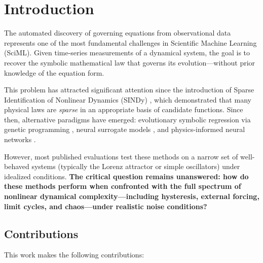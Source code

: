 \section{Introduction}
\label{sec:intro}

The automated discovery of governing equations from observational data represents one of the most fundamental challenges in Scientific Machine Learning (SciML). Given time-series measurements of a dynamical system, the goal is to recover the symbolic mathematical law that governs its evolution---without prior knowledge of the equation form.

This problem has attracted significant attention since the introduction of Sparse Identification of Nonlinear Dynamics (SINDy) \cite{brunton2016}, which demonstrated that many physical laws are \textit{sparse} in an appropriate basis of candidate functions. Since then, alternative paradigms have emerged: evolutionary symbolic regression via genetic programming \cite{cranmer2023}, neural surrogate models \cite{chen2018}, and physics-informed neural networks \cite{raissi2019}.

However, most published evaluations test these methods on a narrow set of well-behaved systems (typically the Lorenz attractor or simple oscillators) under idealized conditions. \textbf{The critical question remains unanswered: how do these methods perform when confronted with the full spectrum of nonlinear dynamical complexity---including hysteresis, external forcing, limit cycles, and chaos---under realistic noise conditions?}

\subsection{Contributions}

This work makes the following contributions:

